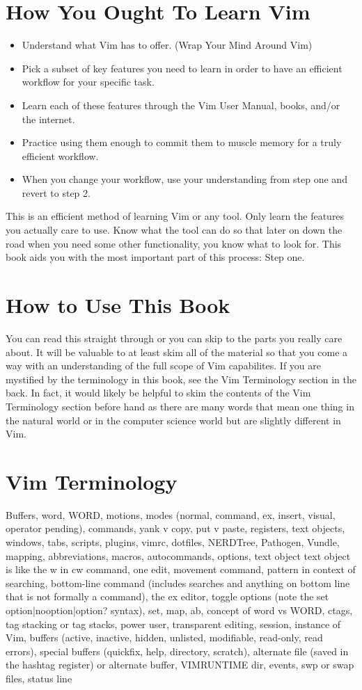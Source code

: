 \documentclass[12pt]{book}
\begin{document}
\section{How You Ought To Learn Vim}
\begin{itemize}
\item Understand what Vim has to offer. (Wrap Your Mind Around Vim)
\item Pick a subset of key features you need to learn in order to have an efficient workflow for your specific task.
\item Learn each of these features through the Vim User Manual, books, and/or the internet.
\item Practice using them enough to commit them to muscle memory for a truly efficient workflow.
\item When you change your workflow, use your understanding from step one and revert to step 2.
\end{itemize}
This is an efficient method of learning Vim or any tool.
Only learn the features you actually care to use.
Know what the tool can do so that later on down the road when you need some other functionality, you know what to look for.
This book aids you with the most important part of this process: Step one.

\section{How to Use This Book}
You can read this straight through or you can skip to the parts you really care about.
It will be valuable to at least skim all of the material so that you come a way with an understanding of the full scope of Vim capabilites.
If you are mystified by the terminology in this book, see the Vim Terminology section in the back.
In fact, it would likely be helpful to skim the contents of the Vim Terminology section before hand as there are many words that mean one thing in the natural world or in the computer science
world but are slightly different in Vim.

\section{Vim Terminology}
Buffers, word, WORD, motions, modes (normal, command, ex, insert, visual, operator pending), commands, yank v copy, put v paste, registers, text objects, windows, tabs, scripts, plugins, vimrc, dotfiles,
NERDTree, Pathogen, Vundle, mapping, abbreviations, macros, autocommands, options, text object text object is like the w in cw command, one edit, movement command, pattern in context of
searching, bottom-line command (includes searches and anything on bottom line that is not formally a command), the ex editor, toggle options (note the set option|nooption|option? syntax),
set, map, ab, concept of word vs WORD, ctags, tag stacking or tag stacks, power user, transparent editing, session, instance of Vim, buffers (active, inactive, hidden, unlisted, modifiable, read-only,
read errors), special buffers (quickfix, help, directory, scratch), alternate file (saved in the hashtag register) or alternate buffer, VIMRUNTIME dir, events, swp or swap files, status line
\end{document}
